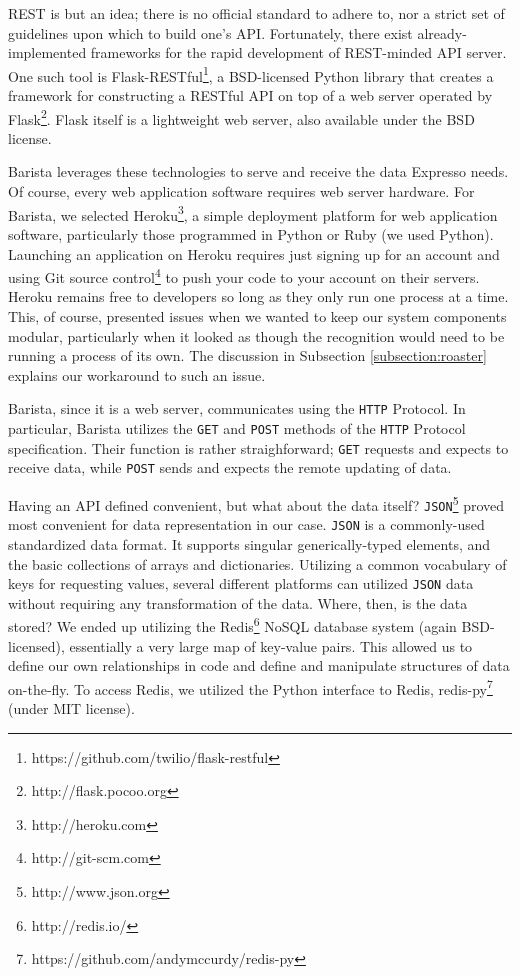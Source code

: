 \documentclass{acm_proc_article-sp}
\begin{document}
REST is but an idea; there is no official standard to adhere to, nor a strict set of guidelines upon which to build one's API. Fortunately, there exist already-implemented frameworks for the rapid development of REST-minded API server. One such tool is Flask-RESTful\footnote{https://github.com/twilio/flask-restful}, a BSD-licensed Python library that creates a framework for constructing a RESTful API on top of a web server operated by Flask\footnote{http://flask.pocoo.org}. Flask itself is a lightweight web server, also available under the BSD license.

Barista leverages these technologies to serve and receive the data Expresso needs. Of course, every web application software requires web server hardware. For Barista, we selected Heroku\footnote{http://heroku.com}, a simple deployment platform for web application software, particularly those programmed in Python or Ruby (we used Python). Launching an application on Heroku requires just signing up for an account and using Git source control\footnote{http://git-scm.com} to push your code to your account on their servers. Heroku remains free to developers so long as they only run one process at a time. This, of course, presented issues when we wanted to keep our system components modular, particularly when it looked as though the recognition would need to be running a process of its own. The discussion in Subsection \ref{subsection:roaster} explains our workaround to such an issue.

Barista, since it is a web server, communicates using the \texttt{HTTP} Protocol. In particular, Barista utilizes the \texttt{GET} and \texttt{POST} methods of the \texttt{HTTP} Protocol specification. Their function is rather straighforward; \texttt{GET} requests and expects to receive data, while \texttt{POST} sends and expects the remote updating of data. 

Having an API defined convenient, but what about the data itself? \texttt{JSON}\footnote{http://www.json.org} proved most convenient for data representation in our case. \texttt{JSON} is a commonly-used standardized data format. It supports singular generically-typed elements, and the basic collections of arrays and dictionaries. Utilizing a common vocabulary of keys for requesting values, several different platforms can utilized \texttt{JSON} data without requiring any transformation of the data. Where, then, is the data stored? We ended up utilizing the Redis\footnote{http://redis.io/} NoSQL database system (again BSD-licensed), essentially a very large map of key-value pairs. This allowed us to define our own relationships in code and define and manipulate structures of data on-the-fly. To access Redis, we utilized the Python interface to Redis, redis-py\footnote{https://github.com/andymccurdy/redis-py} (under MIT license).
\end{document}
